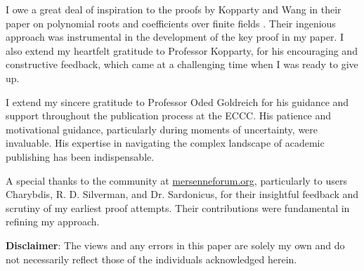 \documentclass{article}
\theoremstyle{plain}
\theoremstyle{definition}
\begin{document}
I owe a great deal of inspiration to the proofs by Kopparty and Wang in their paper on polynomial roots and coefficients over finite fields \cite{koppartywang2014roots}. Their ingenious approach was instrumental in the development of the key proof in my paper. I also extend my heartfelt gratitude to Professor Kopparty, for his encouraging and constructive feedback, which came at a challenging time when I was ready to give up.

I extend my sincere gratitude to Professor Oded Goldreich for his guidance and support throughout the publication process at the ECCC. His patience and motivational guidance, particularly during moments of uncertainty, were invaluable. His expertise in navigating the complex landscape of academic publishing has been indispensable.

A special thanks to the community at \url{mersenneforum.org}, particularly to users Charybdis, R. D. Silverman, and Dr. Sardonicus, for their insightful feedback and scrutiny of my earliest proof attempts. Their contributions were fundamental in refining my approach.

\textbf{Disclaimer}: The views and any errors in this paper are solely my own and do not necessarily reflect those of the individuals acknowledged herein.

\begingroup
\raggedright


\endgroup
\end{document}
